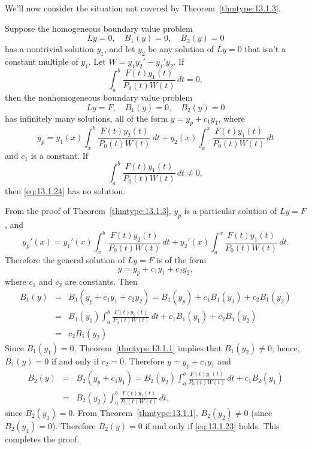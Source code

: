 We'll now consider the situation not covered by Theorem~\ref{thmtype:13.1.3}.

\begin{theorem}
  \color{blue}
  \label{thmtype:13.1.4} Suppose the homogeneous boundary value problem
  \begin{equation}
    \label{eq:13.1.22}Ly=0,\quad B_{1}(y)=0,\quad B_{2}(y)=0
  \end{equation}
  has a nontrivial solution $y_{1}$, and let $y_{2}$ be any solution of $Ly=0$ that isn't a constant
  multiple of $y_{1}$. Let $W=y_{1}y_{2}'-y_{1}'y_{2}$. If
  \begin{equation}
    \label{eq:13.1.23}\int_{a}^{b}\frac{F(t)y_{1}(t)}{P_{0}(t)W(t)}\,dt=0,
  \end{equation}
  then the nonhomogeneous boundary value problem
  \begin{equation}
    \label{eq:13.1.24}Ly=F,\quad B_{1}(y)=0,\quad B_{2}(y)=0
  \end{equation}
  has infinitely many solutions, all of the form $y=y_{p}+c_{1}y_{1}$, where
  \[
    y_{p}=y_{1}(x) \int_{x}^{b}\frac{F(t)y_{2}(t)}{P_{0}(t)W(t)}\,dt+ y_{2}(x) \int_{a}^{x}\frac{F(t)y_{1}(t)}{P_{0}(t)W(t)}\,dt
  \]
  and $c_{1}$ is a constant. If
  \[
    \int_{a}^{b}\frac{F(t)y_{1}(t)}{P_{0}(t)W(t)}\,dt\ne0,
  \]
  then \eqref{eq:13.1.24} has no solution.
\end{theorem}

\proof From the proof of Theorem~\ref{thmtype:13.1.3}, $y_{p}$ is a particular solution of $Ly=F$,
and
\[
  y_{p}'(x)=y_{1}'(x)\int_{x}^{b}\frac{F(t)y_{2}(t)}{P_{0}(t)W(t)}\,dt +y_{2}'(x)\int_{a}^{x}\frac{F(t)y_{1}(t)}{P_{0}(t)W(t)}\,dt.
\]
Therefore the general solution of $Ly=F$ is of the form
\[
  y=y_{p}+c_{1}y_{1}+c_{2}y_{2},
\]
where $c_{1}$ and $c_{2}$ are constants. Then
\begin{eqnarray*}
  B_{1}(y) & = & B_{1}(y_{p}+c_{1}y_{1}+c_{2}y_{2})=B_{1}(y_{p})+c_{1}B_{1}(y_{1})+c_{2}B_{1}(y_{2}) \\
           & = & B_{1}(y_{1})\int_{a}^{b}\frac{F(t)y_{2}(t)}{P_{0}(t)W(t)}\,dt+c_{1}B_{1}(y_{1})+c_{2}B_{1}(y_{2}) \\
           & = & c_{2}B_{1}(y_{2})
\end{eqnarray*}
Since $B_{1}(y_{1})=0$, Theorem~\ref{thmtype:13.1.1} implies that $B_{1}(y_{2})\ne0$; hence,
$B_{1}(y)=0$ if and only if $c_{2}=0$. Therefore $y=y_{p}+c_{1}y_{1}$ and
\begin{eqnarray*}
  B_{2}(y) & = & B_{2}(y_{p}+c_{1}y_{1})=B_{2}(y_{2})\int_{a}^{b}\frac{F(t)y_{1}(t)}{P_{0}(t)W(t)}\,dt+c_{1}B_{2}(y_{1}) \\
           & = & B_{2}(y_{2})\int_{a}^{b}\frac{F(t)y_{1}(t)}{P_{0}(t)W(t)}\,dt,
\end{eqnarray*}
since $B_{2}(y_{1})=0$. From Theorem~\ref{thmtype:13.1.1}, $B_{2}(y_{2})\ne0$ (since
$B_{2}(y_{1})=0$). Therefore $B_{2}(y)=0$ if and only if \eqref{eq:13.1.23} holds. This completes the
proof.

